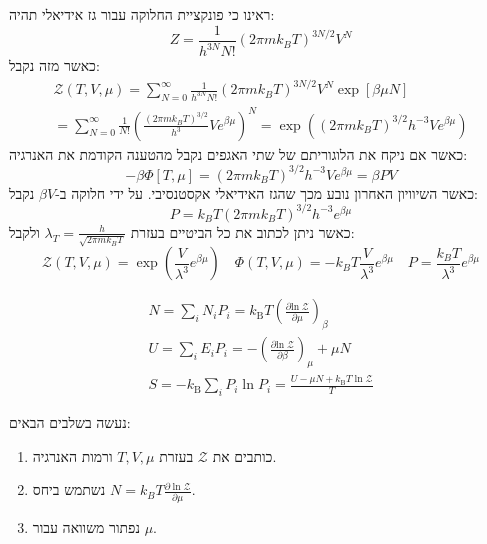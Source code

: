 \documentclass{tstextbook}
\begin{document}
\begin{example}
ראינו כי פונקציית החלוקה עבור גז אידיאלי תהיה:
$$Z=\frac{1}{h^{3N}N!}\left(2\pi m k_{B}T\right)^{3N/2}V^{N}$$
כאשר מזה נקבל:
$$\begin{gather}{\mathcal{Z}}\left( T,V,\mu \right)=\sum_{N=0}^{\infty}{\frac{1}{h^{3N}N!}}\left(2\pi m k_{B}T\right)^{3N/2}V^{N}\exp\left[\beta\mu N\right]\\=\sum_{N=0}^{\infty}\frac{1}{N!}\left(\frac{\left(2\pi m k_{B}T\right)^{3/2}}{h^{3}}V e^{\beta\mu}\right)^{N}=\exp\left(\left(2\pi m k_{B}T\right)^{3/2}h^{-3}V e^{\beta\mu}\right) 
\end{gather}$$
כאשר אם ניקח את הלוגוריתם של שתי האגפים נקבל מהטענה הקודמת את האנרגיה:
$$-\beta \Phi[T,\mu]=\left(2\pi m k_{B}T\right)^{3/2}h^{-3}V e^{\beta\mu}=\beta P V$$
כאשר השיוויון האחרון נובע מכך שהגז האידיאלי אקסטנסיבי. על ידי חלוקה ב-\(\beta V\) נקבל:
$$P=k_{B}T\left(2\pi m k_{B}T\right)^{3/2}h^{-3}e^{\beta\mu}$$
כאשר ניתן לכתוב את כל הביטיים בעזרת \(\lambda_{T}=\frac{h}{\sqrt{ 2\pi mk_{B}T }}\) ולקבל:
$${\mathcal{Z}}\left( T,V,\mu \right)=\exp\left({\frac{V}{\lambda^{3}}}e^{\beta\mu}\right)\quad \Phi\left( T,V,\mu \right)=-k_{B}T\frac{V}{\lambda^{3}}e^{\beta\mu}\quad P=\frac{k_{B}T}{\lambda^{3}}e^{\beta\mu}$$

\end{example}
\begin{proposition}
$$\begin{gather}N=\sum_{i}N_{i}P_{i}=k_{\mathrm{B}}T\left({\frac{\partial\mathrm{ln}\;{\mathcal{Z}}}{\partial\mu}}\right)_{\beta}\\ U=\sum_{i}E_{i}P_{i}=-\left(\frac{\partial\mathrm{ln}\;\mathcal{Z}}{\partial\beta}\right)_{\mu}+\mu N\\ S=-k_{\mathrm{B}}\sum_{i}P_{i}\ln P_{i}={\frac{U-\mu N+k_{\mathrm{B}}T\ln{\mathcal{Z}}}{T}} 
\end{gather}$$

\end{proposition}
\begin{proposition}
נעשה בשלבים הבאים:

  \begin{enumerate}
    \item כותבים את \(\mathcal{Z}\) בעזרת \(T,V,\mu\) ורמות האנרגיה. 


    \item נשתמש ביחס \(N=k_{B}T \frac{\partial \ln \mathcal{Z}}{\partial \mu}\). 


    \item נפתור משוואה עבור \(\mu\). 


  \end{enumerate}
\end{proposition}
\end{document}
